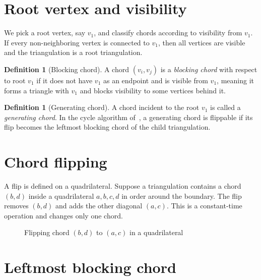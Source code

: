 \documentclass[12pt,a4paper]{report}
\theoremstyle{definition}
\newtheorem{definition}[theorem]{Definition}
\theoremstyle{remark}
\begin{document}
\section{Root vertex and visibility}

We pick a root vertex, say $v_1$, and classify chords according to visibility from $v_1$.
If every non-neighboring vertex is connected to $v_1$, then all vertices are visible and
the triangulation is a root triangulation.

\begin{definition}[Blocking chord]
A chord $(v_i,v_j)$ is a \textit{blocking chord} with respect to root $v_1$ if it does
not have $v_1$ as an endpoint and is visible from $v_1$, meaning it forms a triangle with
$v_1$ and blocks visibility to some vertices behind it.
\end{definition}

\begin{definition}[Generating chord]
A chord incident to the root $v_1$ is called a \textit{generating chord}. In the cycle
algorithm of~\cite{parvez2011}, a generating chord is flippable if its flip becomes the
leftmost blocking chord of the child triangulation.
\end{definition}

\section{Chord flipping}

A flip is defined on a quadrilateral. Suppose a triangulation contains a chord $(b,d)$
inside a quadrilateral $a,b,c,d$ in order around the boundary. The flip removes $(b,d)$
and adds the other diagonal $(a,c)$. This is a constant-time operation and changes only
one chord.

\begin{figure}[h]
    \centering
    \caption{Flipping chord $(b,d)$ to $(a,c)$ in a quadrilateral}
    \label{fig:flip}
\end{figure}

\section{Leftmost blocking chord}
\end{document}
